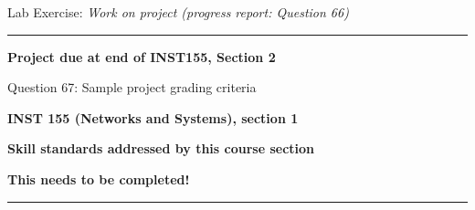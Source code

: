\hskip 10pt Lab Exercise: {\it Work on project (progress report: Question 66)}
  
\vskip 10pt
\hrule \vskip 5pt
\noindent
{}

\hskip 10pt {\bf Project due at end of INST155, Section 2} 

\hskip 10pt Question 67: Sample project grading criteria
 
\vskip 10pt






\vfil \eject

\centerline{\bf INST 155 (Networks and Systems), section 1} \bigskip 
 
\vskip 10pt

\noindent
{\bf Skill standards addressed by this course section}

\vskip 5pt

\noindent
{\bf This needs to be completed!}

\vskip 5pt

\hrule \vskip 10pt
\noindent
{}

\vskip 5pt

